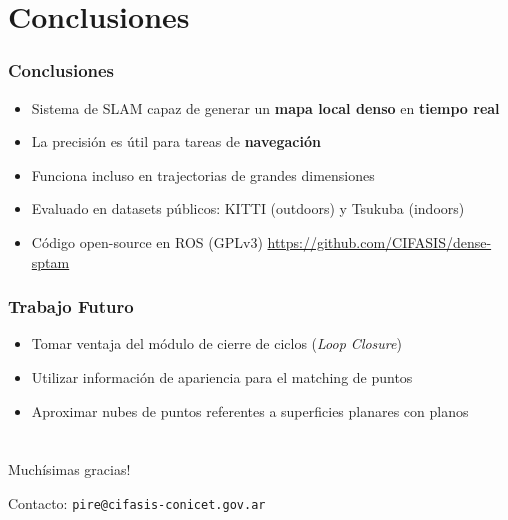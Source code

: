 \documentclass[compress]{beamer}
\begin{document}
\section{Conclusiones}

\begin{frame}
	\frametitle{Conclusiones}
	\begin{itemize}
		\item Sistema de SLAM capaz de generar un \textbf{mapa local denso} en \textbf{tiempo real}
        \item La precisión es útil para tareas de \textbf{navegación}
        \item Funciona incluso en trajectorias de grandes dimensiones
        \item Evaluado en datasets públicos: KITTI (outdoors) y Tsukuba (indoors)
	    \item Código open-source en ROS (GPLv3)
	    \url{https://github.com/CIFASIS/dense-sptam}
	\end{itemize}
\end{frame}

\begin{frame}
	\frametitle{Trabajo Futuro}
	\begin{itemize}
		\item Tomar ventaja del módulo de cierre de ciclos (\emph{Loop Closure})
		\item Utilizar información de apariencia para el matching de puntos
		\item Aproximar nubes de puntos referentes a superficies planares con planos
	\end{itemize}
\end{frame}



\section*{}

\begin{frame}
	\centering
	\Large{Muchísimas gracias!}
	
	
	\vspace{2cm}
	Contacto: {\tt pire@cifasis-conicet.gov.ar}
\end{frame}



\end{document}
